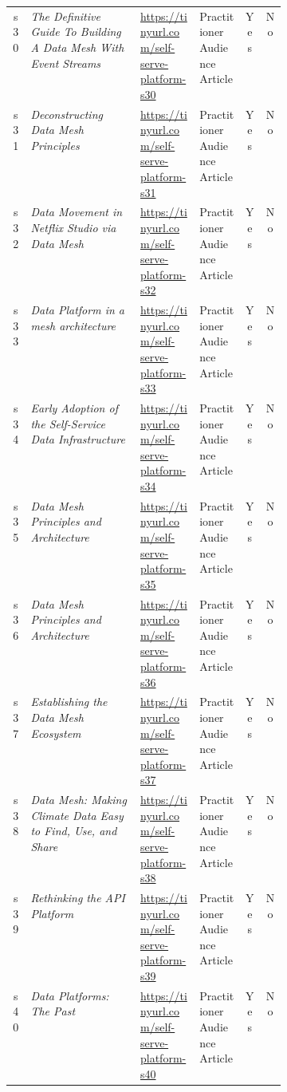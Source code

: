 \begin{tabular}{|c|p{0.4\linewidth}|l|l|c|c|}
s30 &  {\em The Definitive Guide To Building A Data Mesh With Event Streams} & \href{https://https://tinyurl.com/self-serve-platform-s30}{https://tinyurl.com/self-serve-platform-s30} & Practitioner Audience Article & Yes & No\\
s31 &  {\em Deconstructing Data Mesh Principles} & \href{https://https://tinyurl.com/self-serve-platform-s31}{https://tinyurl.com/self-serve-platform-s31} & Practitioner Audience Article & Yes & No\\
s32 &  {\em Data Movement in Netflix Studio via Data Mesh} & \href{https://https://tinyurl.com/self-serve-platform-s32}{https://tinyurl.com/self-serve-platform-s32} & Practitioner Audience Article & Yes & No\\
s33 &  {\em Data Platform in a mesh architecture} & \href{https://https://tinyurl.com/self-serve-platform-s33}{https://tinyurl.com/self-serve-platform-s33} & Practitioner Audience Article & Yes & No\\
s34 &  {\em Early Adoption of the Self-Service Data Infrastructure} & \href{https://https://tinyurl.com/self-serve-platform-s34}{https://tinyurl.com/self-serve-platform-s34} & Practitioner Audience Article & Yes & No\\
s35 &  {\em Data Mesh Principles and Architecture} & \href{https://https://tinyurl.com/self-serve-platform-s35}{https://tinyurl.com/self-serve-platform-s35} & Practitioner Audience Article & Yes & No\\
s36 &  {\em Data Mesh Principles and Architecture} & \href{https://https://tinyurl.com/self-serve-platform-s36}{https://tinyurl.com/self-serve-platform-s36} & Practitioner Audience Article & Yes & No\\
s37 &  {\em Establishing the Data Mesh Ecosystem} & \href{https://https://tinyurl.com/self-serve-platform-s37}{https://tinyurl.com/self-serve-platform-s37} & Practitioner Audience Article & Yes & No\\
s38 &  {\em Data Mesh: Making Climate Data Easy to Find, Use, and Share} & \href{https://https://tinyurl.com/self-serve-platform-s38}{https://tinyurl.com/self-serve-platform-s38} & Practitioner Audience Article & Yes & No\\
s39 &  {\em Rethinking the API Platform} & \href{https://https://tinyurl.com/self-serve-platform-s39}{https://tinyurl.com/self-serve-platform-s39} & Practitioner Audience Article & Yes & No\\
s40 &  {\em Data Platforms: The Past} & \href{https://https://tinyurl.com/self-serve-platform-s40}{https://tinyurl.com/self-serve-platform-s40} & Practitioner Audience Article & Yes & No\\

\end{tabular}
